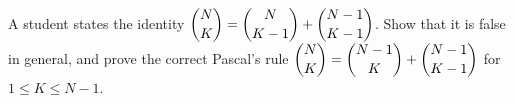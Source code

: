 A student states the identity $\dbinom NK=\dbinom N{K-1}+\dbinom{N-1}{K-1}$. Show that it is false in general, and prove the correct Pascal's rule $\dbinom NK=\dbinom{N-1}K+\dbinom{N-1}{K-1}$ for $1\le K\le N-1$.
